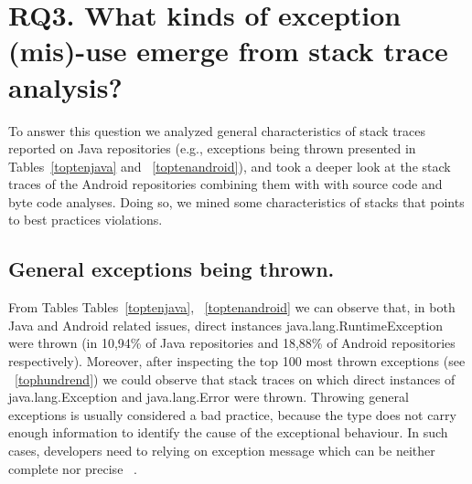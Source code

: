 \documentclass[conference]{IEEEtran}
\begin{document}

\section{RQ3.  What kinds of exception (mis)-use emerge from stack trace analysis? }

To answer this question we analyzed general characteristics of stack traces reported on Java repositories (e.g., exceptions being thrown presented in Tables~\ref{toptenjava} and ~\ref{toptenandroid}), and took a deeper look at the stack traces of the Android repositories combining them with with source code and byte code analyses. Doing so, we mined some characteristics of stacks that points to best practices violations. 

\subsection{General exceptions being thrown.} 

From Tables Tables~\ref{toptenjava}, ~\ref{toptenandroid} we can observe that, in both Java and Android related issues, direct instances java.lang.RuntimeException were thrown  (in 10,94\% of Java repositories and 18,88\% of Android repositories respectively). Moreover, after inspecting the top 100 most thrown exceptions (see ~\ref{tophundrend}) we could observe that stack traces on which direct instances of java.lang.Exception and java.lang.Error were thrown. Throwing general exceptions is usually considered a bad practice, because the type does not carry enough information to identify the cause of the exceptional behaviour. In such cases, developers need to relying on exception message which can be neither complete nor precise ~\cite{gosling2000java}. 
\end{document}
